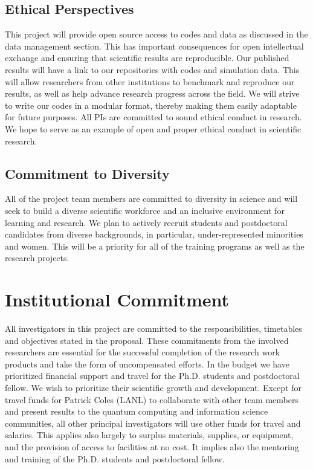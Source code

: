 \documentclass[11pt]{article}
\begin{document}
\subsection{Ethical Perspectives}

This project will provide open source access to codes and data as discussed in the data management section. This has important consequences for open intellectual exchange and ensuring that scientific results are reproducible. Our published results will have a link to our repositories with codes and simulation data. This will allow researchers from other institutions to benchmark and reproduce our results, as well as help advance research progress across the field. We will strive to write our codes in a modular format, thereby making them easily adaptable for future purposes.  All PIs are committed to sound ethical conduct in research.  We hope to serve as an example of open and proper ethical conduct in scientific research.  

\subsection{Commitment to Diversity}
All of the project team members are committed to diversity in science and will seek to build a diverse scientific workforce and an inclusive environment for learning and research.  We plan to actively recruit students and postdoctoral candidates from diverse backgrounds, in particular, under-represented minorities and women.  This will be a priority for all of the training programs as well as the research projects.

\section{Institutional Commitment}

All investigators in this project are committed to the responsibilities, timetables and objectives stated in the proposal. These commitments from the involved researchers are essential for the successful completion of the research work products and take the form of uncompensated efforts. In the budget we have prioritized financial support and travel for the Ph.D. students and postdoctoral fellow.  We wish to prioritize their scientific growth and development.  Except for travel funds for Patrick Coles (LANL) to collaborate with other team members and present results to the quantum computing and information science communities, all other principal investigators will use other funds for travel and salaries.  This applies also largely to surplus materials, supplies, or equipment, and the provision of access to facilities at no cost. It implies also the mentoring and training of the Ph.D. students and postdoctoral fellow. 
\clearpage
\appendix
\end{document}
